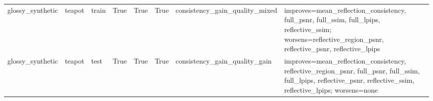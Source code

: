 \begin{tabular}{llllllll}
glossy\_synthetic & teapot & train & True & True & True & consistency\_gain\_quality\_mixed & improves=mean\_reflection\_consistency, full\_psnr, full\_ssim, full\_lpips, reflective\_ssim; worsens=reflective\_region\_psnr, reflective\_psnr, reflective\_lpips \\
glossy\_synthetic & teapot & test & True & True & True & consistency\_gain\_quality\_gain & improves=mean\_reflection\_consistency, reflective\_region\_psnr, full\_psnr, full\_ssim, full\_lpips, reflective\_psnr, reflective\_ssim, reflective\_lpips; worsens=none \\
\bottomrule
\end{tabular}
